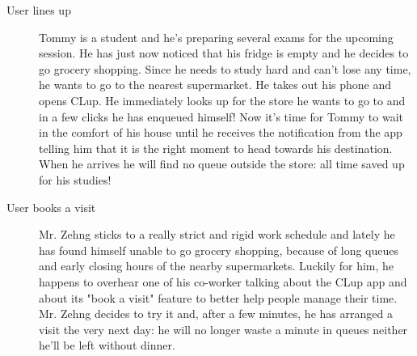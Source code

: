 \begin{description}
    \item[User lines up] 
    Tommy is a student and he’s preparing several exams for the upcoming session.
    He has just now noticed that his fridge is empty and he decides to go grocery shopping. Since he needs to study hard and can't lose any time, he wants to go to the nearest supermarket. He takes out his phone and opens CLup. He immediately looks up for the store he wants to go to and in a few clicks he has enqueued himself! 
    Now it's time for Tommy to wait in the comfort of his house until he receives the notification from the app telling him that it is the right moment to head towards his destination. When he arrives he will find no queue outside the store: all time saved up for his studies!

    \item[User books a visit]
    Mr. Zehng  sticks to a really strict and rigid work schedule and lately he has found himself unable to go grocery shopping, because of long queues and early closing hours of the nearby supermarkets. Luckily for him, he happens to overhear one of his co-worker talking about the CLup app and about its "book a visit" feature to better help people manage their time. Mr. Zehng decides to try it and, after a few minutes, he has arranged a visit the very next day: he will no longer waste a minute in queues neither he'll be left without dinner.


\end{description}
